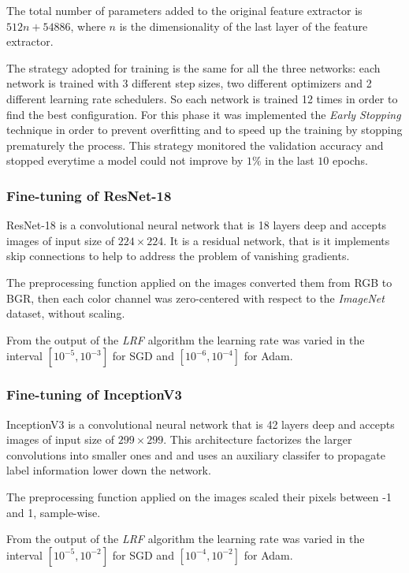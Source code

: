 The total number of parameters added to the original feature extractor is $512n + 54886$, where $n$ is the dimensionality of the last layer of the feature extractor.\par
The strategy adopted for training is the same for all the three networks: each network is trained with 3 different step sizes, two different optimizers and 2 different learning rate schedulers. So each network is trained 12 times in order to find the best configuration. For this phase it was implemented the \textit{Early Stopping} technique in order to prevent overfitting and to speed up the training by stopping prematurely the process. This strategy monitored the validation accuracy and stopped everytime a model could not improve by $1\%$ in the last $10$ epochs.



\subsubsection{Fine-tuning of ResNet-18}\label{sec:resnet18}
ResNet-18 is a convolutional neural network that is 18 layers deep and accepts images of input size of $224 \times 224$. It is a residual network, that is it implements skip connections to help to address the problem of vanishing  gradients. \par
The preprocessing function applied on the images converted them from RGB to BGR, then each color channel was zero-centered with respect to the \textit{ImageNet} dataset, without scaling. \par
From the output of the \textit{LRF} algorithm the learning rate was varied in the interval $[10^{-5}, 10^{-3}]$ for SGD and $[10^{-6}, 10^{-4}]$ for Adam.


\subsubsection{Fine-tuning of InceptionV3}\label{sec:inceptionv3}
InceptionV3 is a convolutional neural network that is 42 layers deep and accepts images of input size of $299 \times 299$. This architecture factorizes the larger convolutions  into smaller ones and and uses an auxiliary classifer to propagate label information lower down the network.
 \par
The preprocessing function applied on the images scaled their pixels between -1 and 1, sample-wise. \par
From the output of the \textit{LRF} algorithm the learning rate was varied in the interval $[10^{-5}, 10^{-2}]$ for SGD and $[10^{-4}, 10^{-2}]$ for Adam.


